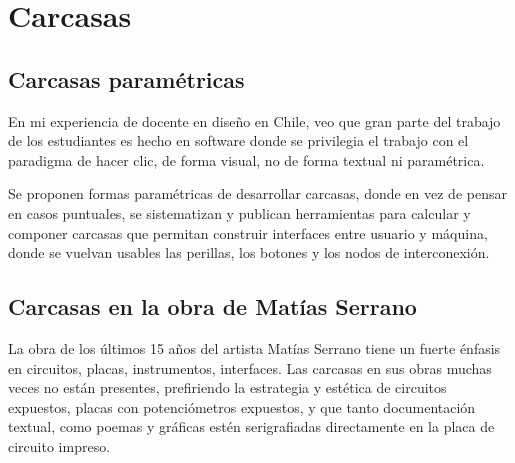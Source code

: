 \documentclass[../candidatura.tex]{subfiles}
\begin{document}
\section{Carcasas}

\avisoesbozo

\subsection{Carcasas paramétricas}

En mi experiencia de docente en diseño en Chile, veo que gran parte del trabajo de los estudiantes es hecho en software donde se privilegia el trabajo con el paradigma de hacer clic, de forma visual, no de forma textual ni paramétrica.

Se proponen formas paramétricas de desarrollar carcasas, donde en vez de pensar en casos puntuales, se sistematizan y publican herramientas para calcular y componer carcasas que permitan construir interfaces entre usuario y máquina, donde se vuelvan usables las perillas, los botones y los nodos de interconexión.




\subsection{Carcasas en la obra de Matías Serrano}

La obra de los últimos 15 años del artista Matías Serrano tiene un fuerte énfasis en circuitos, placas, instrumentos, interfaces. Las carcasas en sus obras muchas veces no están presentes, prefiriendo la estrategia y estética de circuitos expuestos, placas con potenciómetros expuestos, y que tanto documentación textual, como poemas y gráficas estén serigrafiadas directamente en la placa de circuito impreso.


\newpage
\end{document}

